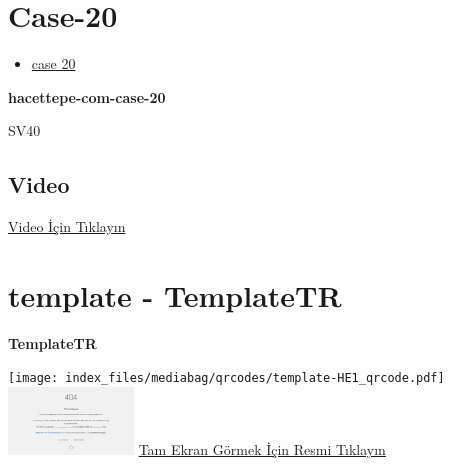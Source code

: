 \documentclass[
  letterpaper,
  DIV=11,
  numbers=noendperiod]{scrreprt}
\providecommand{\tightlist}{%
  \setlength{\itemsep}{0pt}\setlength{\parskip}{0pt}}\usepackage{longtable,booktabs,array}
\begin{document}
\hypertarget{sec-hacettepe-case-of-the-month-case-20}{%
\section{Case-20}\label{sec-hacettepe-case-of-the-month-case-20}}

\begin{itemize}
\tightlist
\item
  \href{https://www.youtube.com/watch?v=f8nE-6oR5VI&ab_channel=KemalKosemehmetoglu}{case
  20}
\end{itemize}

\textbf{hacettepe-com-case-20}

\begin{tcolorbox}[enhanced jigsaw, breakable, opacitybacktitle=0.6, arc=.35mm, colbacktitle=quarto-callout-tip-color!10!white, colback=white, toptitle=1mm, left=2mm, opacityback=0, colframe=quarto-callout-tip-color-frame, titlerule=0mm, rightrule=.15mm, bottomrule=.15mm, toprule=.15mm, bottomtitle=1mm, title=\textcolor{quarto-callout-tip-color}{\faLightbulb}\hspace{0.5em}{Tanı}, coltitle=black, leftrule=.75mm]

SV40

\end{tcolorbox}

\hypertarget{video-19}{%
\subsection{Video}\label{video-19}}

\href{https://www.youtube.com/watch?v=f8nE-6oR5VI}{Video İçin Tıklayın}

\hypertarget{sec-template}{%
\section{template - TemplateTR}\label{sec-template}}

\textbf{TemplateTR}

\texttt{[image: index\_files/mediabag/qrcodes/template-HE1\_qrcode.pdf]}
\href{https://images.patolojiatlasi.com/template/HE1.html}{\includegraphics[width=0.25\textwidth,height=\textheight]{./screenshots/thumbnail_template-HE1.png}}
\href{https://images.patolojiatlasi.com/template/HE1.html}{Tam Ekran
Görmek İçin Resmi Tıklayın}
\end{document}
